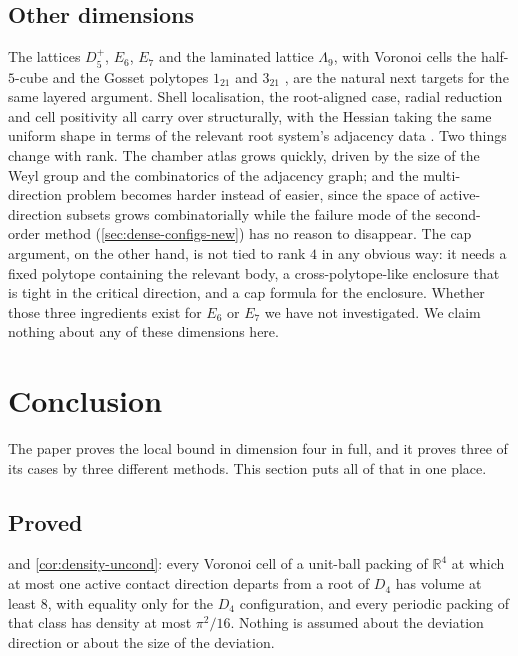 \documentclass[11pt,reqno]{amsart}
\renewcommand{\_}{\origunderscore\allowbreak}
\numberwithin{equation}{section}
\theoremstyle{plain}
\theoremstyle{definition}
\theoremstyle{remark}
\begin{document}
\subsection{Other dimensions}\label{sec:other-dims-new}

The lattices $D_5^+$, $E_6$, $E_7$ and the laminated lattice
$\Lambda_9$, with Voronoi cells the half-$5$-cube and the Gosset
polytopes $1_{21}$ and $3_{21}$ \cite{CS1988,Cox73}, are the natural
next targets for the same layered argument. Shell localisation, the
root-aligned case, radial reduction and cell positivity all carry over
structurally, with the Hessian taking the same uniform shape in terms of
the relevant root system's adjacency data \cite{Hum90}. Two things
change with rank. The chamber atlas grows quickly, driven by the size of
the Weyl group and the combinatorics of the adjacency graph; and the
multi-direction problem becomes harder instead of easier, since the
space of active-direction subsets grows combinatorially while the
failure mode of the second-order method (\cref{sec:dense-configs-new})
has no reason to disappear. The cap argument, on the other hand, is not
tied to rank $4$ in any obvious way: it needs a fixed polytope containing the
relevant body, a cross-polytope-like enclosure that is tight in the
critical direction, and a cap formula for the enclosure. Whether those
three ingredients exist for $E_6$ or $E_7$ we have not investigated. We
claim nothing about any of these dimensions here.
\section{Conclusion}\label{sec:status}

The paper proves the local bound in dimension four in full, and it
proves three of its cases by three different methods. This section puts
all of that in one place.

\subsection{Proved}

 and \cref{cor:density-uncond}: every Voronoi
cell of a unit-ball packing of $\mathbb{R}^4$ at which at most one
active contact direction departs from a root of $D_4$ has volume at
least $8$, with equality only for the $D_4$ configuration, and every
periodic packing of that class has density at most $\pi^2/16$. Nothing
is assumed about the deviation direction or about the size of the
deviation.
\end{document}
